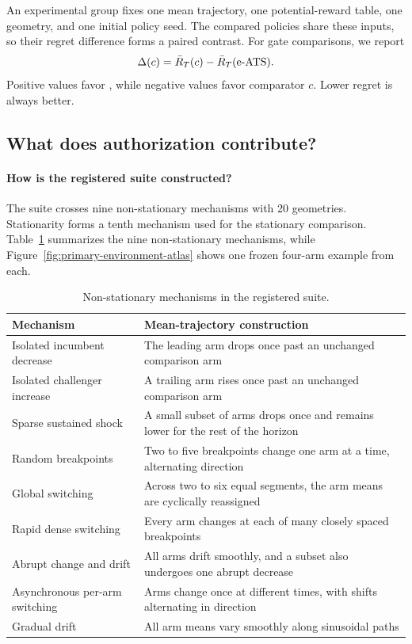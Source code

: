 An experimental group fixes one mean trajectory, one potential-reward table,
one geometry, and one initial policy seed.
The compared policies share these inputs, so their regret difference forms a paired contrast.
For gate comparisons, we report
\[
 \Delta(c)
 =
 \bar R_T(c)-\bar R_T(\text{e-ATS{}}).
\]
Positive values favor \method{}, while negative values favor comparator $c$.
Lower regret is always better.

\subsection{What does authorization contribute?}

\paragraph{How is the registered suite constructed?}
The suite crosses nine non-stationary mechanisms with 20 geometries.
Stationarity forms a tenth mechanism used for the stationary comparison.
Table~\ref{tab:registered-environments} summarizes the nine non-stationary
mechanisms, while Figure~\ref{fig:primary-environment-atlas} shows one frozen
four-arm example from each.

\begin{table}[p]
\centering
\footnotesize
\caption{Non-stationary mechanisms in the registered suite.}
\label{tab:registered-environments}
\begin{tabular}{@{}p{}p{}@{}}
\toprule
Mechanism & Mean-trajectory construction \\
\midrule
Isolated incumbent decrease &
The leading arm drops once past an unchanged comparison arm \\
Isolated challenger increase &
A trailing arm rises once past an unchanged comparison arm \\
Sparse sustained shock &
A small subset of arms drops once and remains lower for the rest of the horizon \\
Random breakpoints &
Two to five breakpoints change one arm at a time, alternating direction \\
Global switching &
Across two to six equal segments, the arm means are cyclically reassigned \\
Rapid dense switching &
Every arm changes at each of many closely spaced breakpoints \\
Abrupt change and drift &
All arms drift smoothly, and a subset also undergoes one abrupt decrease \\
Asynchronous per-arm switching &
Arms change once at different times, with shifts alternating in direction \\
Gradual drift &
All arm means vary smoothly along sinusoidal paths \\
\bottomrule
\end{tabular}
\end{table}

